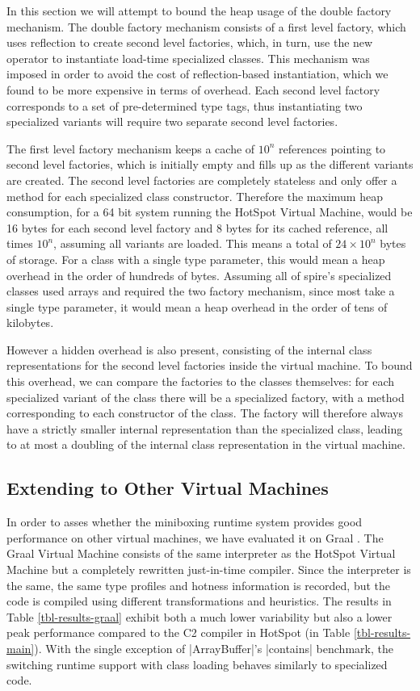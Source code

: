 In this section we will attempt to bound the heap usage of the double factory mechanism. The double factory mechanism consists of a first level factory, which uses reflection to create second level factories, which, in turn, use the new operator to instantiate load-time specialized classes. This mechanism was imposed in order to avoid the cost of reflection-based instantiation, which we found to be more expensive in terms of overhead. Each second level factory corresponds to a set of pre-determined type tags, thus instantiating two specialized variants will require two separate second level factories.

The first level factory mechanism keeps a cache of $10^n$ references pointing to second level factories, which is initially empty and fills up as the different variants are created. The second level factories are completely stateless and only offer a method for each specialized class constructor. Therefore the maximum heap consumption, for a 64 bit system running the HotSpot Virtual Machine, would be 16 bytes for each second level factory and 8 bytes for its cached reference, all times $10^n$, assuming all variants are loaded. This means a total of $24 \times 10^n$ bytes of storage. For a class with a single type parameter, this would mean a heap overhead in the order of hundreds of bytes. Assuming all of spire's specialized classes used arrays and required the two factory mechanism, since most take a single type parameter, it would mean a heap overhead in the order of tens of kilobytes.

However a hidden overhead is also present, consisting of the internal class representations for the second level factories inside the virtual machine. To bound this overhead, we can compare the factories to the classes themselves: for each specialized variant of the class there will be a specialized factory, with a method corresponding to each constructor of the class. The factory will therefore always have a strictly smaller internal representation than the specialized class, leading to at most a doubling of the internal class representation in the virtual machine.

\subsection{Extending to Other Virtual Machines}
\label{subsec-eval-other-vms}

In order to asses whether the miniboxing runtime system provides good performance on other virtual machines, we have evaluated it on Graal \cite{graal}. The Graal Virtual Machine consists of the same interpreter as the HotSpot Virtual Machine but a completely rewritten just-in-time compiler. Since the interpreter is the same, the same type profiles and hotness information is recorded, but the code is compiled using different transformations and heuristics. The results in Table \ref{tbl-results-graal} exhibit both a much lower variability but also a lower peak performance compared to the C2 compiler in HotSpot (in Table \ref{tbl-results-main}). With the single exception of |ArrayBuffer|'s |contains| benchmark, the switching runtime support with class loading behaves similarly to specialized code.        

